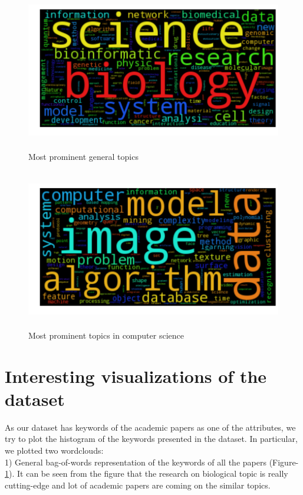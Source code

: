 \documentclass[a4paper, 11pt]{article}
\begin{document}
\begin{figure}[h]
    \centering
    \includegraphics[width=16cm,height=7cm]{visual-gen}
    \caption{Most prominent general topics}
    \label{fig:topic}
\end{figure}
\begin{figure}[h]
    \centering
    \includegraphics[width=16cm,height=7cm]{venue-image}
    \caption{Most prominent topics in computer science}
    \label{fig:venue}
\end{figure}


\section{Interesting visualizations of the dataset}
As our dataset has keywords of the academic papers as one of the attributes, we try to plot the histogram of the keywords presented in the dataset. In particular, we plotted two wordclouds: \\

1) General bag-of-words representation of the keywords of all the papers (Figure-\ref{fig:topic}). It can be seen from the figure that the research on biological topic is really cutting-edge and lot of academic papers are coming on the similar topics. \\
 
\end{document}
